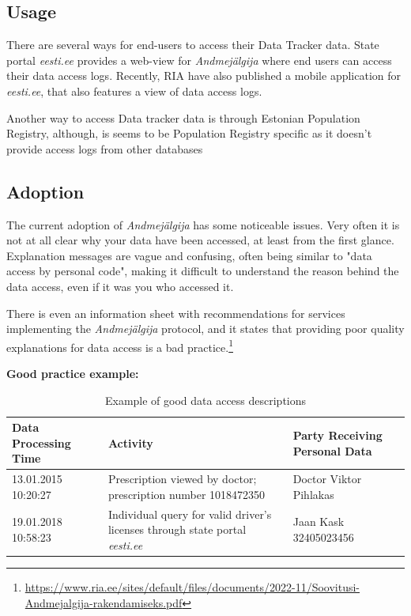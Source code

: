\subsection{Usage}
There are several ways for end-users to access their Data Tracker data. State portal \textit{eesti.ee} provides a web-view for \textit{Andmejälgija} where end users can access their data access logs. Recently, RIA have also published a mobile application for \textit{eesti.ee}, that also features a view of data access logs. 

Another way to access Data tracker data is through Estonian Population Registry, although, is seems to be Population Registry specific as it doesn't provide access logs from other databases



\subsection{Adoption}
The current adoption of \textit{Andmejälgija} has some noticeable issues. Very often it is not at all clear why your data have been accessed, at least from the first glance. Explanation messages are vague and confusing, often being similar to "data access by personal code", making it difficult to understand the reason behind the data access, even if it was you who accessed it.

There is even an information sheet with recommendations for services implementing the \textit{Andmejälgija} protocol, and it states that providing poor quality explanations for data access is a bad practice.\footnote{\url{https://www.ria.ee/sites/default/files/documents/2022-11/Soovitusi-Andmejalgija-rakendamiseks.pdf}} 

\textbf{Good practice example:}

\begin{table}[H]
\centering
\begin{tabular}{|p{3cm}|p{6cm}|p{4cm}|}
\hline
\textbf{Data Processing Time} & \textbf{Activity} & \textbf{Party Receiving Personal Data} \\
\hline
13.01.2015 10:20:27 & Prescription viewed by doctor; prescription number 1018472350 & Doctor Viktor Pihlakas \\
\hline
19.01.2018 10:58:23 & Individual query for valid driver's licenses through state portal \textit{eesti.ee} & Jaan Kask 32405023456 \\
\hline
\end{tabular}
\caption{Example of good data access descriptions}
\end{table}

